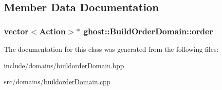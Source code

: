 \subsection{Member Data Documentation}
\hypertarget{classghost_1_1BuildOrderDomain_a61f5d1cd92865b46aa330ee31a15ab1d}{
\subsubsection[{order}]{\setlength{\rightskip}{0pt plus 5cm}vector$<${\bf Action}$>$$\ast$ ghost\-::\-Build\-Order\-Domain\-::order\hspace{0.3cm}{\ttfamily [private]}}}\label{classghost_1_1BuildOrderDomain_a61f5d1cd92865b46aa330ee31a15ab1d}


The documentation for this class was generated from the following files\-:\begin{DoxyCompactItemize}
\item 
include/domains/\hyperlink{buildorderDomain_8hpp}{buildorder\-Domain.\-hpp}\item 
src/domains/\hyperlink{buildorderDomain_8cpp}{buildorder\-Domain.\-cpp}\end{DoxyCompactItemize}
